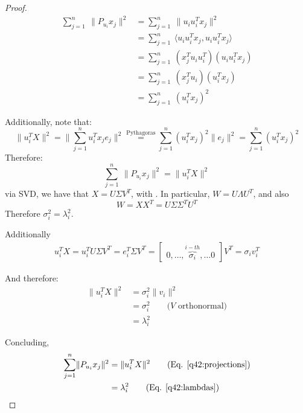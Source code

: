 \documentclass{article}
\begin{document}
\begin{enumerate}[label=\textbf{\large\arabic*)}]
\begin{proof}
\begin{align*}
  \sum_{j=1}^{n} \ \lVert P_{u_i} x_j \rVert ^2 &= \sum_{j=1}^{n}\  \lVert u_i u_i^{T} x_j \rVert ^2 \\
  &= \sum_{j=1}^{n} \ \langle u_i u_i^{T} x_j, u_i u_i^{T} x_j \rangle \\
  &= \sum_{j=1}^{n} \ (x_j^{T} u_i u_i^{T})( u_i u_i^{T} x_j) \\
  &= \sum_{j=1}^{n} \ (x_j^{T} u_i) (u_i^{T} x_j) \\
  & = \sum_{j=1}^{n}\  (u_i^{T}x_j) ^2
\end{align*}

Additionally, note that:
\[
  \lVert u_i^{T} X \rVert ^2 = \lVert \sum_{j=1}^{n} u_i^{T}x_j e_j \rVert ^2  \stackrel{\text{Pythagoras}}{=} \sum_{j=1}^{n} (u_{i}^{T} x_j) ^2 \lVert e_j \rVert  ^2 = \sum_{j=1}^{n} (u^{T}_{i} x_j)  ^2
\]
Therefore:
  \begin{equation} \label{q42:projections}
  \sum_{j=1}^{n} \ \lVert P_{u_i} x_j \rVert ^2 =  \lVert u^{T}_{i} X \rVert  ^2
\end{equation}
via SVD, we have that $X = U \Sigma V^{T}$, with . In particular, $W = U \Lambda U^{T}$, and also
  \[
    W = X X^{T} = U \Sigma \Sigma ^{T} U^{T}
  \]
Therefore $\sigma_i ^2 = \lambda_i ^2$. 

Additionally
\begin{align*}
  u_i ^{T} X = u_i ^{T} U \Sigma V^{T} = e_i^{T} \Sigma V^{T} = \begin{bmatrix} 0, \ldots, \overbrace{\sigma_i}^{i-th}, \ldots 0 \end{bmatrix} V^{T} = \sigma_i v_i^{T}
\end{align*}

And therefore:
\begin{equation} \label{q42:lambdas}
 \begin{aligned}
  \lVert u_i^{T} X \rVert  ^2 &= \sigma_i ^2 \lVert v_i \rVert ^2\\
   &= \sigma_i ^2  \qquad \text{($V$ orthonormal)}  \\
  &= \lambda_i ^2 
\end{aligned}
\end{equation}


Concluding, 
\begin{align*}
  \sum_{j=1}^{n} \lVert P_{u_i} x_j \rVert ^2  & = \lVert u_i^{T} X \rVert  ^2  \tag{Eq. \ref{q42:projections}}\\
  & = \lambda_i ^2 \tag{Eq. \ref{q42:lambdas}}
\end{align*}
\end{proof}
  
\end{enumerate}
\end{document}
